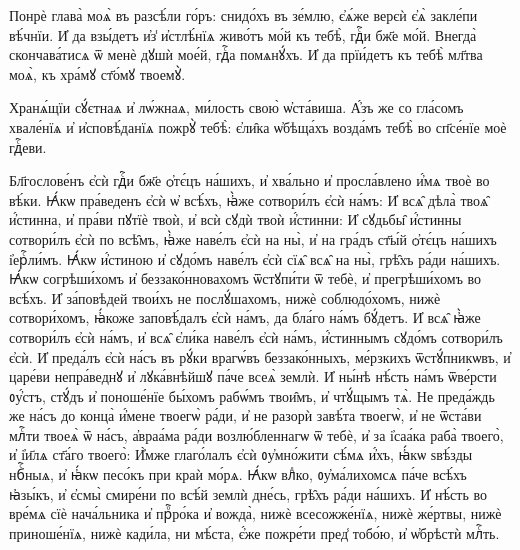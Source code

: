 \hKv Понрѐ глава̀ моѧ̀ въ разсѣ́ли го́ръ: снидо́хъ  въ зе́млю, є҆ѧ́же верєѝ є҆ѧ̀ закле́пи вѣ́чнїи. 
\hKv И҆  да взы́детъ и҆з̾ и҆стлѣ́нїѧ живо́тъ мо́й къ тебѣ̀, гдⷭ҇и  бж҃е мо́й. 
\hKv Внегда̀ скончава́тисѧ ѿ менѐ дꙋшѝ мое́й,  гдⷭ҇а помѧнꙋ́хъ. 
\hKv  И҆ да прїи́детъ къ тебѣ̀ мл҃тва  моѧ̀, къ хра́мꙋ ст҃о́мꙋ твоемꙋ̀. 
%

\hKv Хранѧ́щїи сꙋ́єтнаѧ и҆ лѡ́жнаѧ, ми́лость свою̀  ѡ҆ста́виша. 
\hKv А҆́зъ же со гла́сомъ хвале́нїѧ и҆  и҆сповѣ́данїѧ пожрꙋ̀ тебѣ̀: є҆ли̑ка ѡ҆бѣща́хъ возда́мъ  тебѣ̀ во сп҃се́нїе моѐ гдⷭ҇еви.  
%


\cuLettrine 
Бл҃гослове́нъ є҆сѝ гдⷭ҇и бж҃е ѻ҆тє́цъ на́шихъ,  и҆ хва́льно и҆ просла́влено и҆́мѧ твоѐ во вѣ́ки. 
\hKv  Ꙗ҆́кѡ пра́веденъ є҆сѝ ѡ҆ всѣ́хъ, ꙗ҆̀же сотвори́лъ  є҆сѝ на́мъ: 
\hKv И҆ всѧ̑ дѣла̀ твоѧ̑ и҆́стинна, и҆ пра́ви  пꙋтїѐ твоѝ, и҆ всѝ сꙋдѝ твоѝ и҆́стинни: 
\hKv И҆ сꙋдьбы̑  и҆́стинны сотвори́лъ є҆сѝ по всѣ̑мъ, ꙗ҆̀же наве́лъ  є҆сѝ на ны̀, и҆ на гра́дъ ст҃ы́й ѻ҆тє́цъ на́шихъ  і҆ерⷭ҇ли́мъ. 
\hKv Ꙗ҆́кѡ и҆́стиною и҆ сꙋдо́мъ наве́лъ  є҆сѝ сїѧ̑ всѧ̑ на ны̀, грѣ̑хъ ра́ди на́шихъ. 
\hKv Ꙗ҆́кѡ  согрѣши́хомъ и҆ беззако́нновахомъ ѿстꙋпи́ти ѿ тебѐ, и҆  прегрѣши́хомъ во всѣ́хъ. 
\hKv И҆ за́повѣдей твои́хъ не  послꙋ́шахомъ, нижѐ соблюдо́хомъ, нижѐ сотвори́хомъ,  ꙗ҆́коже заповѣ́далъ є҆сѝ на́мъ, да бла́го на́мъ бꙋ́детъ.  
\hKv И҆ всѧ̑ ꙗ҆̀же сотвори́лъ є҆сѝ на́мъ, и҆ всѧ̑  є҆ли́ка наве́лъ є҆сѝ на́мъ, и҆́стиннымъ сꙋдо́мъ  сотвори́лъ є҆сѝ. 
\hKv И҆ преда́лъ є҆сѝ на́съ въ рꙋ́ки  врагѡ́въ беззако́нныхъ, ме́рзкихъ ѿстꙋ́пникѡвъ, и҆ царе́ви  непра́веднꙋ и҆  лꙋка́внѣйшꙋ  па́че всеѧ̀ землѝ. 
\hKv И҆ ны́нѣ нѣ́сть на́мъ ѿве́рсти  ᲂу҆́стъ, стꙋ́дъ и҆ поноше́нїе бы́хомъ рабѡ́мъ твои̑мъ, и҆  чтꙋ́щымъ тѧ̀. 
\hKv Не преда́ждь же на́съ до конца̀ и҆́мене  твоегѡ̀ ра́ди, и҆ не разорѝ завѣ́та твоегѡ̀, и҆ не  
ѿста́ви млⷭ҇ти твоеѧ̀ ѿ на́съ, а҆враа́ма ра́ди  возлю́бленнагѡ ѿ тебѐ, и҆ за і҆саа́ка раба̀ твоего̀, и҆  і҆и҃лѧ ст҃а́го твоего̀: 
\hKv И҆̀мже глаго́лалъ є҆сѝ  ᲂу҆мно́жити сѣ́мѧ и҆́хъ, ꙗ҆́кѡ ѕвѣ́зды нбⷭ҇ныѧ, и҆  ꙗ҆́кѡ песо́къ при краѝ мо́рѧ. 
\hKv Ꙗ҆́кѡ влⷣко,  ᲂу҆ма́лихомсѧ па́че всѣ́хъ ꙗ҆зы́къ, и҆ є҆смы̀ смире́ни  по всѣ́й землѝ дне́сь, грѣ̑хъ ра́ди на́шихъ. 
\hKv И҆  нѣ́сть во вре́мѧ сїѐ нача́льника и҆ прⷪ҇ро́ка и҆ вожда̀,  нижѐ всесожже́нїѧ, нижѐ же́ртвы, нижѐ приноше́нїѧ, 
нижѐ  кади́ла, ни мѣ́ста, є҆́же пожре́ти пред̾ тобо́ю, и҆  ѡ҆брѣстѝ млⷭ҇ть. 
